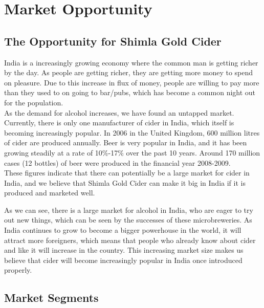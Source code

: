 \documentclass[11pt]{article}
\begin{document}
\section{Market Opportunity}
  \subsection{The Opportunity for Shimla Gold Cider}

		India is a increasingly growing economy where the common man is getting
		richer by the day. As people are getting richer, they are getting more
		money to spend on pleasure. Due to this increase in flux of money, people
		are willing to pay more than they used to on going to bar/pubs, which 
		has become a common night out for the population. \\
		As the demand for alcohol increases, we have found an untapped market.
		Currently, there is only one manufacturer of cider in India, which itself
		is becoming increasingly popular. In 2006 in the United Kingdom, 600 million 
		litres of cider are produced annually. Beer is very popular in India, and
		it has been growing steadily at a rate of 10\%-17\% over the past 10 years.
		Around 170 million cases (12 bottles) of beer were produced in the financial
		year 2008-2009. \\
		These figures indicate that there can potentially be a large market for
		cider in India, and we believe that Shimla Gold Cider can make it big in
		India if it is produced and marketed well.

As we can see, there is a large market for alcohol in India, who are eager to try out new things, which can be seen by the successes of these microbreweries. As India continues to grow to become a bigger powerhouse in the world, it will attract more foreigners, which means that people who already know about cider and like it will increase in the country. This increasing market size makes us believe that cider will become increasingly popular in India once introduced properly.
 
  \subsection{Market Segments}

\newpage
\end{document}
